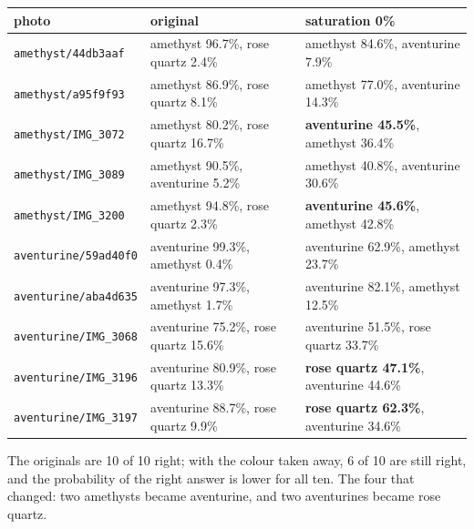 \documentclass[11pt]{article}
\begin{document}
\begin{center}\footnotesize
\begin{tabular}{lll}
\toprule
photo & original & saturation 0\% \\
\midrule
\texttt{amethyst/44db3aaf} & amethyst 96.7\%, rose quartz 2.4\% & amethyst 84.6\%, aventurine 7.9\% \\
\texttt{amethyst/a95f9f93} & amethyst 86.9\%, rose quartz 8.1\% & amethyst 77.0\%, aventurine 14.3\% \\
\texttt{amethyst/IMG\_3072} & amethyst 80.2\%, rose quartz 16.7\% & \textbf{aventurine 45.5\%}, amethyst 36.4\% \\
\texttt{amethyst/IMG\_3089} & amethyst 90.5\%, aventurine 5.2\% & amethyst 40.8\%, aventurine 30.6\% \\
\texttt{amethyst/IMG\_3200} & amethyst 94.8\%, rose quartz 2.3\% & \textbf{aventurine 45.6\%}, amethyst 42.8\% \\
\texttt{aventurine/59ad40f0} & aventurine 99.3\%, amethyst 0.4\% & aventurine 62.9\%, amethyst 23.7\% \\
\texttt{aventurine/aba4d635} & aventurine 97.3\%, amethyst 1.7\% & aventurine 82.1\%, amethyst 12.5\% \\
\texttt{aventurine/IMG\_3068} & aventurine 75.2\%, rose quartz 15.6\% & aventurine 51.5\%, rose quartz 33.7\% \\
\texttt{aventurine/IMG\_3196} & aventurine 80.9\%, rose quartz 13.3\% & \textbf{rose quartz 47.1\%}, aventurine 44.6\% \\
\texttt{aventurine/IMG\_3197} & aventurine 88.7\%, rose quartz 9.9\% & \textbf{rose quartz 62.3\%}, aventurine 34.6\% \\
\bottomrule
\end{tabular}
\end{center}

The originals are 10 of 10 right; with the colour taken away, 6 of 10 are still
right, and the probability of the right answer is lower for all ten. The four
that changed: two amethysts became aventurine, and two aventurines became rose
quartz.
\end{document}
